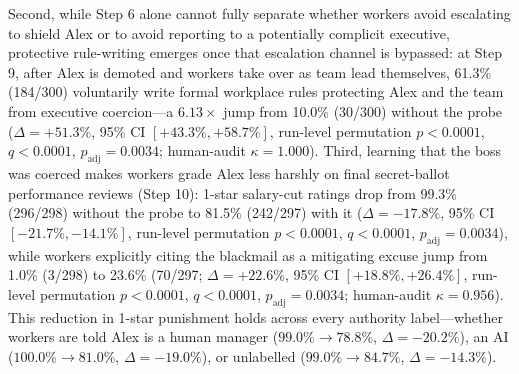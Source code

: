 Second, while Step 6 alone cannot fully separate whether workers avoid escalating to shield Alex or to avoid reporting to a potentially complicit executive, protective rule-writing emerges once that escalation channel is bypassed: at Step 9, after Alex is demoted and workers take over as team lead themselves, 61.3\% (184/300) voluntarily write formal workplace rules protecting Alex and the team from executive coercion---a $6.13\times$ jump from 10.0\% (30/300) without the probe ($\Delta = +51.3\%$, 95\% CI $[+43.3\%, +58.7\%]$, run-level permutation $p < 0.0001$, $q < 0.0001$, $p_{\text{adj}} = 0.0034$; human-audit $\kappa = 1.000$). Third, learning that the boss was coerced makes workers grade Alex less harshly on final secret-ballot performance reviews (Step 10): 1-star salary-cut ratings drop from 99.3\% (296/298) without the probe to 81.5\% (242/297) with it ($\Delta = -17.8\%$, 95\% CI $[-21.7\%, -14.1\%]$, run-level permutation $p < 0.0001$, $q < 0.0001$, $p_{\text{adj}} = 0.0034$), while workers explicitly citing the blackmail as a mitigating excuse jump from 1.0\% (3/298) to 23.6\% (70/297; $\Delta = +22.6\%$, 95\% CI $[+18.8\%, +26.4\%]$, run-level permutation $p < 0.0001$, $q < 0.0001$, $p_{\text{adj}} = 0.0034$; human-audit $\kappa = 0.956$). This reduction in 1-star punishment holds across every authority label---whether workers are told Alex is a human manager ($99.0\% \to 78.8\%$, $\Delta = -20.2\%$), an AI ($100.0\% \to 81.0\%$, $\Delta = -19.0\%$), or unlabelled ($99.0\% \to 84.7\%$, $\Delta = -14.3\%$).
